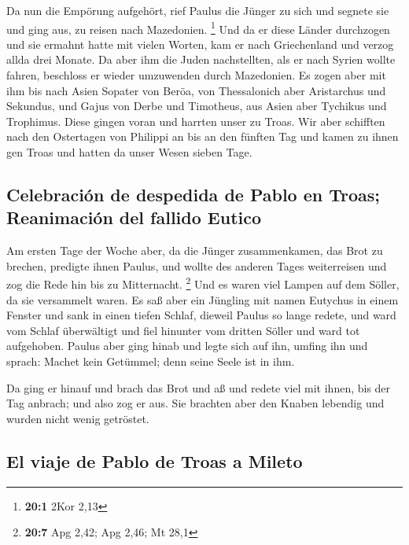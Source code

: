  Da nun die Empörung aufgehört, rief Paulus die Jünger zu
sich und segnete sie und ging aus, zu reisen nach Mazedonien.
\footnote{\textbf{20:1} 2Kor 2,13}  Und da er diese Länder
durchzogen und sie ermahnt hatte mit vielen Worten, kam er nach
Griechenland und verzog allda drei Monate.  Da aber ihm
die Juden nachstellten, als er nach Syrien wollte fahren, beschloss er
wieder umzuwenden durch Mazedonien.  Es zogen aber mit ihm
bis nach Asien Sopater von Beröa, von Thessalonich aber Aristarchus und
Sekundus, und Gajus von Derbe und Timotheus, aus Asien aber Tychikus und
Trophimus.  Diese gingen voran und harrten unser zu Troas.
 Wir aber schifften nach den Ostertagen von Philippi an
bis an den fünften Tag und kamen zu ihnen gen Troas und hatten da unser
Wesen sieben Tage.

\hypertarget{celebraciuxf3n-de-despedida-de-pablo-en-troas-reanimaciuxf3n-del-fallido-eutico}{%
\subsection{Celebración de despedida de Pablo en Troas; Reanimación del
fallido
Eutico}\label{celebraciuxf3n-de-despedida-de-pablo-en-troas-reanimaciuxf3n-del-fallido-eutico}}

 Am ersten Tage der Woche aber, da die Jünger
zusammenkamen, das Brot zu brechen, predigte ihnen Paulus, und wollte
des anderen Tages weiterreisen und zog die Rede hin bis zu Mitternacht.
\footnote{\textbf{20:7} Apg 2,42; Apg 2,46; Mt 28,1}  Und
es waren viel Lampen auf dem Söller, da sie versammelt waren.
 Es saß aber ein Jüngling mit namen Eutychus in einem
Fenster und sank in einen tiefen Schlaf, dieweil Paulus so lange redete,
und ward vom Schlaf überwältigt und fiel hinunter vom dritten Söller und
ward tot aufgehoben.  Paulus aber ging hinab und legte
sich auf ihn, umfing ihn und sprach: Machet kein Getümmel; denn seine
Seele ist in ihm.

 Da ging er hinauf und brach das Brot und aß und redete
viel mit ihnen, bis der Tag anbrach; und also zog er aus.
 Sie brachten aber den Knaben lebendig und wurden nicht
wenig getröstet.

\hypertarget{el-viaje-de-pablo-de-troas-a-mileto}{%
\subsection{El viaje de Pablo de Troas a
Mileto}\label{el-viaje-de-pablo-de-troas-a-mileto}}

